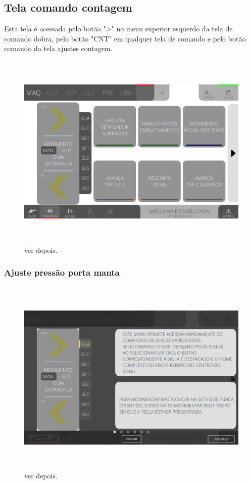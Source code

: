 \thispagestyle{fancy}
\vspace*{\fill}
\subsection{Tela comando contagem}
 Esta tela é acessada pelo botão "\textgreater" no menu superior esquerdo da tela de comando dobra, pelo botão "CNT" em qualquer tela de comando e pelo botão comando da tela ajustes contagem.
\begin{figure}[h]
  \centering
  \includegraphics[width=576px,height=360px]{src/images/08-count/commands/e-Tela-Principal.png}
  \caption{ver depois.}
   \label{}
\end{figure}

\newpage
\thispagestyle{fancy}
\vspace*{\fill}
\subsubsection{\small{Ajuste pressão porta manta}}
\begin{figure}[h]
  \centering
  \includegraphics[width=576px,height=360px]{src/images/08-count/commands/e-1.png}
  \caption{ver depois.}
   \label{}
\end{figure}
\vspace*{\fill}

